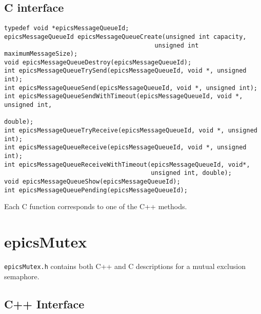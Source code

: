 \subsection{C interface}

\begin{verbatim}typedef void *epicsMessageQueueId;
epicsMessageQueueId epicsMessageQueueCreate(unsigned int capacity,
                                         unsigned int maximumMessageSize);
void epicsMessageQueueDestroy(epicsMessageQueueId);
int epicsMessageQueueTrySend(epicsMessageQueueId, void *, unsigned int);
int epicsMessageQueueSend(epicsMessageQueueId, void *, unsigned int);
int epicsMessageQueueSendWithTimeout(epicsMessageQueueId, void *, unsigned int,
                                                                 double);
int epicsMessageQueueTryReceive(epicsMessageQueueId, void *, unsigned int);
int epicsMessageQueueReceive(epicsMessageQueueId, void *, unsigned int);
int epicsMessageQueueReceiveWithTimeout(epicsMessageQueueId, void*,
                                        unsigned int, double);
void epicsMessageQueueShow(epicsMessageQueueId);
int epicsMessageQueuePending(epicsMessageQueueId);
\end{verbatim}
Each C function corresponds to one of the C++ methods.

\section{epicsMutex}

\verb|epicsMutex.h| contains both C++ and C descriptions for a mutual exclusion semaphore.

\subsection{C++ Interface}

